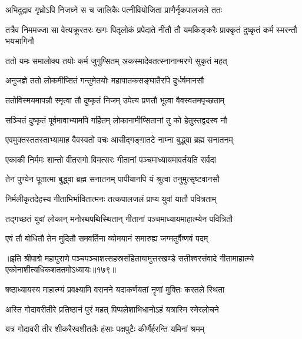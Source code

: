 \twolineshloka
{अभिदुद्राव गृध्रोऽपि निजघ्ने स च जालिकैः}
{पत्नीवियोजिता प्राणैर्नृकपालजले ततः} %

\threelineshloka
{तत्रैव निममज्जा सा वेत्यक्रूरतरः खगः}
{पितृलोकं प्रपेदाते नीतौ तौ यमकिङ्करैः}
{प्राक्कृतं दुष्कृतं कर्म स्मरन्तौ भयभागिनौ} %

\twolineshloka
{ततो यमः समालोक्य तयोः कर्म जुगुप्सितम्}
{अकस्मादेवतत्स्नानान्मरणे सुकृतं महत्} %

\twolineshloka
{अनुजज्ञे ततो लोकमीप्सितं गन्तुमेतयोः}
{महापातकसङ्घातैरपि दुर्धर्षमानसौ} %

\twolineshloka
{ततोविस्मयमापन्नौ स्मृत्वा तौ दुष्कृतं निजम्}
{उपेत्य प्रणतौ भूत्वा वैवस्वतमपृच्छताम्} %

\twolineshloka
{सञ्चितं दुष्कृतं पूर्वमावाभ्यामपि गर्हितम्}
{लोकानामीप्सितानां तु को हेतुस्तद्वदस्व नौ} %

\twolineshloka
{एवमुक्तस्ततस्ताभ्यामाह वैवस्वतो वचः}
{आसीद्गङ्गातटे नाम्ना बुद्ध्वा ब्रह्म सनातनम्} %

\twolineshloka
{एकाकी निर्ममः शान्तो वीतरागो विमत्सरः}
{गीतानां पञ्चमाध्यायमावर्तयति सर्वदा} %

\twolineshloka
{तेन पुण्येन पूतात्मा बुद्ध्वा ब्रह्म सनातनम्}
{पापीयानपि यं श्रुत्वा तनुमुत्सृष्टवानसौ} %

\twolineshloka
{निर्मलीकृतदेहस्य गीताभिर्भावितात्मनः}
{तत्कपालजलं प्राप्य युवां यातौ पवित्रताम्} %

\twolineshloka
{तद्गच्छतं युवां लोकान् मनोरथपथिस्थितान्}
{गीतानां पञ्चमाध्यायमाहात्म्येन पवित्रितौ} %

\twolineshloka
{एवं तौ बोधितौ तेन मुदितौ समवर्तिना}
{व्योमयानं समारुह्य जग्मतुर्वैष्णवं पदम्} %

॥इति श्रीपाद्मे महापुराणे पञ्चपञ्चाशत्सहस्रसंहितायामुत्तरखण्डे सतीश्वरसंवादे गीतामाहात्म्ये एकोनाशीत्यधिकशततमोऽध्यायः॥१७९॥

\genMangalaShloka

\closesub

\ganapatyadiDhyanam
\padmaPuranam



\twolineshloka
{षष्ठाध्यायस्य माहात्म्यं प्रवक्ष्यामि वरानने}
{यदाकर्णयतां नॄणां मुक्तिः करतले स्थिता} %

\twolineshloka
{अस्ति गोदावरीतीरे प्रतिष्ठानं पुरं महत्}
{पिप्पलेशाभिधानोऽहं यत्रास्मि स्मेरलोचने} %

\twolineshloka
{यत्र गोदावरी तीर शीकरैरवशीतलैः}
{हंसाः पक्षपुटैः कीर्णैर्हरन्ति यमिनां श्रमम्} %

